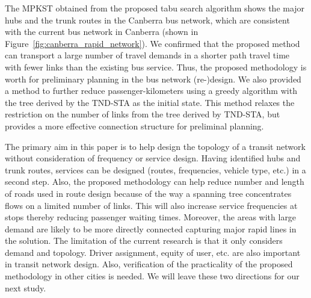 \documentclass[10pt,english]{article}
\newcommand{\figref}[1]{Figure~\ref{#1}}
\begin{document}
The MPKST obtained from the proposed tabu search algorithm shows the major hubs and the trunk routes in the Canberra bus network, which are consistent with the current bus network in Canberra (shown in \figref{fig:canberra_rapid_network}). We confirmed that the proposed method can transport a large number of travel demands in a shorter path travel time with fewer links than the existing bus service. Thus, the proposed methodology is worth for preliminary planning in the bus network (re-)design. We also provided a method to further reduce passenger-kilometers using a greedy algorithm with the tree derived by the TND-STA as the initial state. This method relaxes the restriction on the number of links from the tree derived by TND-STA, but provides a more effective connection structure for preliminal planning.

The primary aim in this paper is to help design the topology of a transit network without consideration of frequency or service design. Having identified hubs and trunk routes, services can be designed (routes, frequencies, vehicle type, etc.) in a second step. Also, the proposed methodology can help reduce number and length of roads used in route design because of the way a spanning tree concentrates flows on a limited number of links. This will also increase service frequencies at stops thereby reducing passenger waiting times. Moreover, the areas with large demand are likely to be more directly connected capturing major rapid lines in the solution. The limitation of the current research is that it only considers demand and topology. Driver assignment, equity of user, etc. are also important in transit network design. Also, verification of the practicality of the proposed methodology in other cities is needed. We will leave these two directions for our next study.









\end{document}
